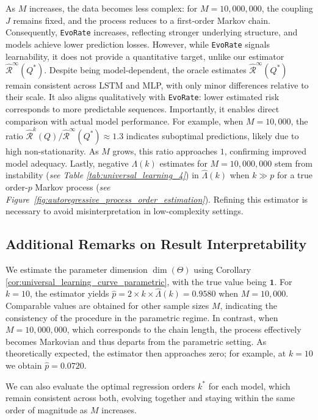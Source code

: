 \documentclass{article}
\begin{document}
As $M$ increases, the data becomes less complex: for $M = 10{,}000{,}000$, the coupling $J$ remains fixed, and the process reduces to a first-order Markov chain. Consequently, \texttt{EvoRate} increases, reflecting stronger underlying structure, and models achieve lower prediction losses. However, while \texttt{EvoRate} signals learnability, it does not provide a quantitative target, unlike our estimator $\hat{\mathcal{R}}^{\infty}(Q^*)$. Despite being model-dependent, the oracle estimates $\hat{\mathcal{R}}^{\infty}(Q^*)$ remain consistent across LSTM and MLP, with only minor differences relative to their scale. It also aligns qualitatively with \texttt{EvoRate}: lower estimated risk corresponds to more predictable sequences. Importantly, it enables direct comparison with actual model performance. For example, when $M = 10{,}000$, the ratio $\hat{\mathcal{R}}^{k}(Q) / \hat{\mathcal{R}}^{\infty}(Q^*) \approx 1.3$ indicates suboptimal predictions, likely due to high non-stationarity. As $M$ grows, this ratio approaches $1$, confirming improved model adequacy.
Lastly, negative $\Lambda(k)$ estimates for $M = 10{,}000{,}000$ stem from instability (\textit{see Table \ref{tab:universal_learning_4}}) in $\hat{\Lambda}(k)$ when $k \gg p$ for a true order-$p$ Markov process (\textit{see Figure~\ref{fig:autoregressive_process_order_estimation}}). Refining this estimator is necessary to avoid misinterpretation in low-complexity settings.

\subsection*{Additional Remarks on Result Interpretability}
We estimate the parameter dimension \( \dim(\Theta) \) using Corollary \ref{cor:universal_learning_curve_parametric}, with the true value being \( \mathbf{1} \). For \( k = 10 \), the estimator yields \( \hat{p} = 2 \times k \times \hat{\Lambda}(k) = 0.9580 \) when \( M = 10{,}000 \). Comparable values are obtained for other sample sizes \( M \), indicating the consistency of the procedure in the parametric regime. In contrast, when \( M = 10{,}000{,}000 \), which corresponds to the chain length, the process effectively becomes Markovian and thus departs from the parametric setting. As theoretically expected, the estimator then approaches zero; for example, at \( k = 10 \) we obtain \( \hat{p} = 0.0720 \).

We can also evaluate the optimal regression orders \( k^* \) for each model, which remain consistent across both, evolving together and staying within the same order of magnitude as \( M \) increases.
\end{document}
